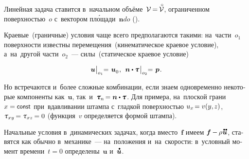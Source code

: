 \begin{otherlanguage}{russian}
Линейная задача ставится в~начальном объёме~\hbox{$\mathcal{V} \hspace{-0.2ex} = \hspace{-0.2ex} \mathcircabove{\mathcal{V}}$\hspace{-0.12em}}, ограниченном поверхностью~$o$ с~вектором пл\'{о}щади~${\bm{n} do}$ ().

Краевые~(граничные) условия чаще всего предполагаются такими: на~\hbox{части~${o_1}$} поверхности известны перемещения~(кинематическое краевое условие), а~на~другой \hbox{части~${o_2}$}~--- силы~(статическое краевое условие) %

\nopagebreak\vspace{-0.64em}\begin{equation}
\bm{u} \hspace{0.1ex} \bigr|_{o_1} \hspace{-0.64ex} = \hspace{0.2ex} \bm{u}_{\raisemath{-0.1em}{0}} \hspace{0.16ex} , \:\:
\bm{n} \dotp \mathboldtau \hspace{.2ex} \bigr|_{o_2} \hspace{-0.64ex} = \hspace{.2ex} \bm{p} \hspace{.16ex} .
\end{equation}

Но встречаются и~более сложные комбинации, если знаем одно\-времен\-но некоторые компоненты как~$\bm{u}$, так~и~${\mathboldtau_{\hspace{-0.1ex}n} \hspace{-0.25ex} = \bm{n} \dotp \mathboldtau}$. Для примера, на~плоской грани~${x = \const}$ при~вдавливании штампа с~гладкой поверхностью ${u_x \hspace{-0.32ex} = v (y , \hspace{-0.1ex} z)}$, ${\mathtau_{xy} \hspace{-0.2ex} = \mathtau_{xz} \hspace{-0.2ex} = 0}$ (функция~$v$ определяется формой штампа).

Начальные условия в~динамических задачах, когда вместо~$\bm{f}$ имеем ${\bm{f} \hspace{-0.1ex} - \hspace{-0.1ex} \rho \hspace{0.1ex} \mathdotdotabove{\bm{u}}}$, ставятся как обычно в~механике~--- на~положения и~на~скорости: в~условный момент времени~${t \!=\! 0}$ определены~$\bm{u}$ и~$\mathdotabove{\bm{u}}$.


\end{otherlanguage}

